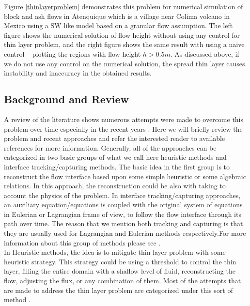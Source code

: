 \documentclass[letterpaper,10pt]{article}
\begin{document}
Figure \ref{thinlayerproblem}   demonstrates this problem for numerical simulation of block and ash flows in  Atenquique which is a village near Colima volcano in Mexico using a SW like model based on a granular flow assumption. The left figure shows the numerical solution of flow height without using any control for thin layer problem, and the right figure shows the same result with using a naive control -- plotting the regions with flow height $h>0.5m$. As discussed above, if we do not use any control on the numerical solution, the spread thin layer causes instability and inaccuracy in the obtained results.

\subsection{Background and Review}
A review of the literature shows numerous attempts were made to overcome this problem over time especially in the recent years \cite{Medeiros2013,Balzano1998,Aureli2008,Bunya2009,Casulli2009a,
Kesserwani2011,DAlpaos2007,Castro2005a}.
Here we will briefly review the problem and recent approaches and refer the interested reader to available references for more information.
Generally, all of the approaches can be 
categorized in two basic groups of what we call here heuristic methods and interface tracking/capturing methods.
The basic idea in the first group is to reconstruct the flow interface based upon 
some simple heuristic or some algebraic relations. In this approach, the reconstruction could be also with taking to account the physics of the problem. In interface tracking/capturing approaches, an auxiliary equation/equations is coupled with the original system of equations in Eulerian or Lagrangian frame of view, to follow the flow interface through its path over time. 
The reason that we mention both tracking and capturing is that they are usually used for Lagrangian and Eulerian methods respectively.For more information about this group of methods please see \cite{Glimm1995,Unverdi1992,Osher1988,Anderson1998,hirt1981vfv}.\\


In Heuristic methods, the idea is to mitigate thin layer problem with some heuristic strategy. This strategy could be using a threshold to control the thin layer, filling the entire domain with a shallow level of fluid, reconstructing the flow, adjusting the flux, or any combination of them. Most of the attempts that are made to address the thin layer problem are categorized under this sort of method \cite{Aureli2008,Bunya2009,Castro2005a,Kesserwani2011}.
\end{document}
